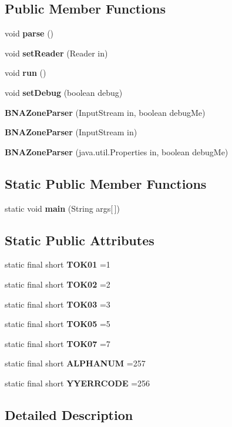 \subsection*{Public Member Functions}
\begin{DoxyCompactItemize}
\item 
void {\bf parse} ()
\item 
void {\bf set\-Reader} (Reader in)
\item 
void {\bf run} ()
\item 
void {\bf set\-Debug} (boolean debug)
\item 
{\bf B\-N\-A\-Zone\-Parser} (Input\-Stream in, boolean debug\-Me)
\item 
{\bf B\-N\-A\-Zone\-Parser} (Input\-Stream in)
\item 
{\bf B\-N\-A\-Zone\-Parser} (java.\-util.\-Properties in, boolean debug\-Me)
\end{DoxyCompactItemize}
\subsection*{Static Public Member Functions}
\begin{DoxyCompactItemize}
\item 
static void {\bf main} (String args[$\,$])
\end{DoxyCompactItemize}
\subsection*{Static Public Attributes}
\begin{DoxyCompactItemize}
\item 
static final short {\bf T\-O\-K01} =1
\item 
static final short {\bf T\-O\-K02} =2
\item 
static final short {\bf T\-O\-K03} =3
\item 
static final short {\bf T\-O\-K05} =5
\item 
static final short {\bf T\-O\-K07} =7
\item 
static final short {\bf A\-L\-P\-H\-A\-N\-U\-M} =257
\item 
static final short {\bf Y\-Y\-E\-R\-R\-C\-O\-D\-E} =256
\end{DoxyCompactItemize}


\subsection{Detailed Description}


